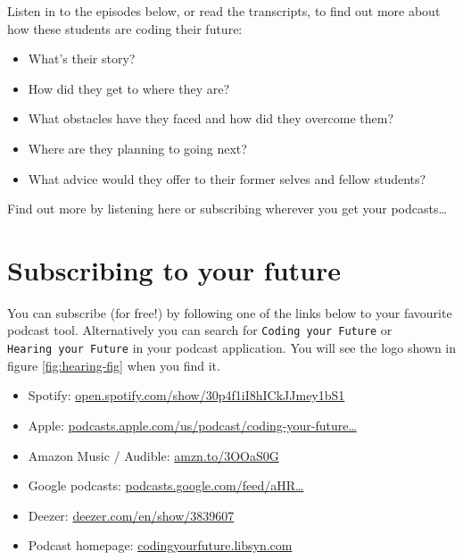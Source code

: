 \documentclass[
]{book}
\providecommand{\tightlist}{%
  \setlength{\itemsep}{0pt}\setlength{\parskip}{0pt}}
\begin{document}
Listen in to the episodes below, or read the transcripts, to find out more about how these students are coding their future:

\begin{itemize}
\tightlist
\item
  What's their story?\\
\item
  How did they get to where they are?
\item
  What obstacles have they faced and how did they overcome them?
\item
  Where are they planning to going next?
\item
  What advice would they offer to their former selves and fellow students?
\end{itemize}

Find out more by listening here or subscribing wherever you get your podcasts\ldots{}

\hypertarget{subscribing}{%
\section{Subscribing to your future}\label{subscribing}}

You can subscribe (for free!) by following one of the links below to your favourite podcast tool. Alternatively you can search for \texttt{Coding\ your\ Future} or \texttt{Hearing\ your\ Future} in your podcast application. You will see the logo shown in figure \ref{fig:hearing-fig} when you find it.

\begin{itemize}
\tightlist
\item
  Spotify: \href{https://open.spotify.com/show/30p4f1iI8hICkJJmey1bS1}{open.spotify.com/show/30p4f1iI8hICkJJmey1bS1}
\item
  Apple: \href{https://podcasts.apple.com/us/podcast/coding-your-future/id1632252996}{podcasts.apple.com/us/podcast/coding-your-future\ldots{}}
\item
  Amazon Music / Audible: \href{https://amzn.to/3OOaS0G}{amzn.to/3OOaS0G}
\item
  Google podcasts: \href{https://podcasts.google.com/feed/aHR0cHM6Ly9mZWVkcy5saWJzeW4uY29tLzI5OTE4OS9yc3M=}{podcasts.google.com/feed/aHR\ldots{}}
\item
  Deezer: \href{https://www.deezer.com/en/show/3839607}{deezer.com/en/show/3839607}
\item
  Podcast homepage: \href{https://codingyourfuture.libsyn.com/}{codingyourfuture.libsyn.com}
\end{itemize}
\end{document}
